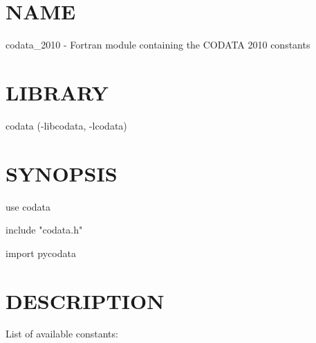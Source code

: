 \section*{NAME}
codata\_2010 - Fortran module containing the CODATA 2010 constants

\section*{LIBRARY}
codata (-libcodata, -lcodata)

\section*{SYNOPSIS}
{\ttfamily
use codata

include "codata.h"

import pycodata

}
\section*{DESCRIPTION}
List of available constants:

